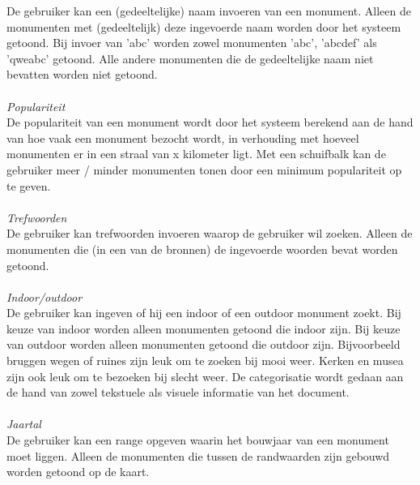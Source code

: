 \documentclass[a4paper,10pt]{article}
\begin{document}
			De gebruiker kan een (gedeeltelijke) naam invoeren van een monument. Alleen de monumenten met (gedeeltelijk) deze ingevoerde naam worden door het systeem getoond. Bij invoer van 'abc' worden zowel monumenten 'abc', 'abcdef' als 'qweabc' getoond. Alle andere monumenten die de gedeeltelijke naam niet bevatten worden niet getoond.\\
			\\
			\textit{Populariteit}\\
			De populariteit van een monument wordt door het systeem berekend aan de hand van hoe vaak een monument bezocht wordt, in verhouding met hoeveel monumenten er in een straal van x kilometer ligt. Met een schuifbalk kan de gebruiker meer / minder monumenten tonen door een minimum populariteit op te geven.\\
			\\
			\textit{Trefwoorden}\\
			De gebruiker kan trefwoorden invoeren waarop de gebruiker wil zoeken. Alleen de monumenten die (in een van de bronnen) de ingevoerde woorden bevat worden getoond.\\
			\\
			\textit{Indoor/outdoor}\\
			De gebruiker kan ingeven of hij een indoor of een outdoor monument zoekt. Bij keuze van indoor worden alleen monumenten getoond die indoor zijn. Bij keuze van outdoor worden alleen monumenten getoond die outdoor zijn. Bijvoorbeeld bruggen wegen of ruines zijn leuk om te zoeken bij mooi weer. Kerken en musea zijn ook leuk om te bezoeken bij slecht weer. De categorisatie wordt gedaan aan de hand van zowel tekstuele als visuele informatie van het document.\\
			\\
			\textit{Jaartal}\\
			De gebruiker kan een range opgeven waarin het bouwjaar van een monument moet liggen. Alleen de monumenten die tussen de randwaarden zijn gebouwd worden getoond op de kaart.
\end{document}
